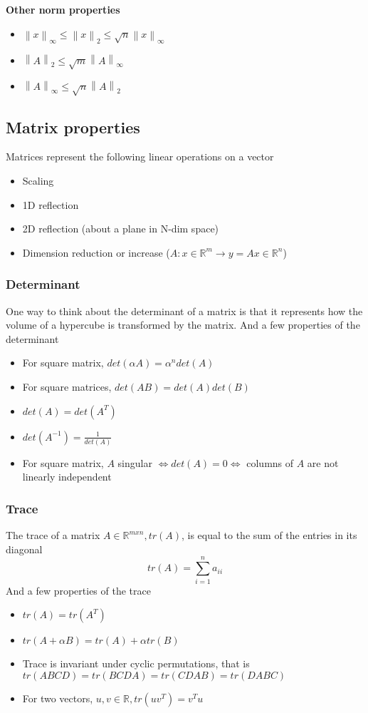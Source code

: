 \documentclass{article}
\newcommand{\norm}[2]{\left\lVert#1\right\rVert_#2}
\begin{document}
\textbf{Other norm properties}
\begin{itemize}
    \item $\norm{x}{\infty} \leq \norm{x}{2} \leq \sqrt{n}\norm{x}{\infty}$
    \item $\norm{A}{2} \leq \sqrt{m}\norm{A}{\infty}$
    \item $\norm{A}{\infty} \leq \sqrt{n}\norm{A}{2}$
\end{itemize}

\subsection{Matrix properties}
Matrices represent the following linear operations on a vector
\begin{itemize}
    \item Scaling
    \item 1D reflection
    \item 2D reflection (about a plane in N-dim space)
    \item Dimension reduction or increase ($A: x\in \mathbb{R}^m \rightarrow y = Ax \in \mathbb{R}^n$)
\end{itemize}
\subsubsection{Determinant}
One way to think about the determinant of a matrix is that it represents how the volume of a hypercube is transformed by the matrix.
And a few properties of the determinant
\begin{itemize}
    \item For square matrix, $det(\alpha A) = \alpha^ndet(A)$
    \item For square matrices, $det(AB) = det(A)det(B)$
    \item $det(A) = det(A^T)$
    \item $det(A^{-1}) = \frac{1}{det(A)}$
    \item For square matrix, $A$ singular $\Leftrightarrow det(A) = 0 \Leftrightarrow$ columns of $A$ are not linearly independent
\end{itemize}

\subsubsection{Trace}
The trace of a matrix $A \in \mathbb{R}^{mxn}, tr(A)$, is equal to the sum of the entries in its diagonal
\begin{equation*}
    tr(A) = \sum_{i = 1}^n a_{ii}
\end{equation*}
And a few properties of the trace
\begin{itemize}
    \item $tr(A) = tr(A^T)$
    \item $tr(A + \alpha B) = tr(A) + \alpha tr(B)$
    \item Trace is invariant under cyclic permutations, that is $tr(ABCD) = tr(BCDA) = tr(CDAB) = tr(DABC)$
    \item For two vectors, $u, v \in \mathbb{R}, tr(uv^T) = v^Tu$
\end{itemize}
\end{document}
